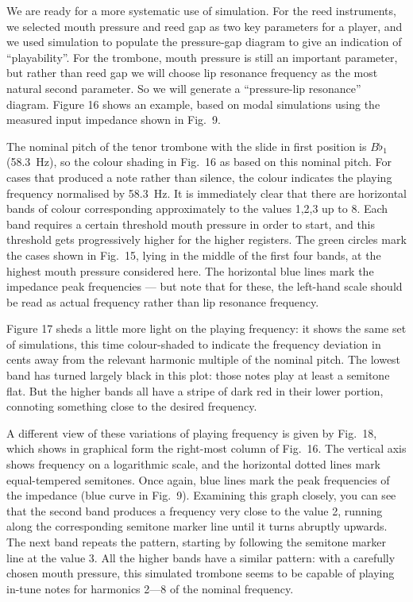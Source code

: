   We are ready for a more systematic use of simulation. For the reed 
  instruments, we selected mouth pressure and reed gap as two key parameters 
  for a player, and we used simulation to populate the pressure-gap diagram to 
  give an indication of “playability”. For the trombone, mouth pressure is 
  still an important parameter, but rather than reed gap we will choose lip 
  resonance frequency as the most natural second parameter. So we will generate 
  a “pressure-lip resonance” diagram. Figure 16 shows an example, based on 
  modal simulations using the measured input impedance shown in Fig.\ 9. 

  The nominal pitch of the tenor trombone with the slide in first position is 
  $B\flat_1$ (58.3~Hz), so the colour shading in Fig.\ 16 as based on this 
  nominal pitch. For cases that produced a note rather than silence, the colour 
  indicates the playing frequency normalised by 58.3~Hz. It is immediately 
  clear that there are horizontal bands of colour corresponding approximately 
  to the values 1,2,3 up to 8. Each band requires a certain threshold mouth 
  pressure in order to start, and this threshold gets progressively higher for 
  the higher registers. The green circles mark the cases shown in Fig.\ 15, 
  lying in the middle of the first four bands, at the highest mouth pressure 
  considered here. The horizontal blue lines mark the impedance peak 
  frequencies --- but note that for these, the left-hand scale should be read 
  as actual frequency rather than lip resonance frequency. 

  Figure 17 sheds a little more light on the playing frequency: it shows the 
  same set of simulations, this time colour-shaded to indicate the frequency 
  deviation in cents away from the relevant harmonic multiple of the nominal 
  pitch. The lowest band has turned largely black in this plot: those notes 
  play at least a semitone flat. But the higher bands all have a stripe of dark 
  red in their lower portion, connoting something close to the desired 
  frequency. 

  A different view of these variations of playing frequency is given by Fig.\ 
  18, which shows in graphical form the right-most column of Fig.\ 16. The 
  vertical axis shows frequency on a logarithmic scale, and the horizontal 
  dotted lines mark equal-tempered semitones. Once again, blue lines mark the 
  peak frequencies of the impedance (blue curve in Fig.\ 9). Examining this 
  graph closely, you can see that the second band produces a frequency very 
  close to the value 2, running along the corresponding semitone marker line 
  until it turns abruptly upwards. The next band repeats the pattern, starting 
  by following the semitone marker line at the value 3. All the higher bands 
  have a similar pattern: with a carefully chosen mouth pressure, this 
  simulated trombone seems to be capable of playing in-tune notes for harmonics 
  2—8 of the nominal frequency. 


